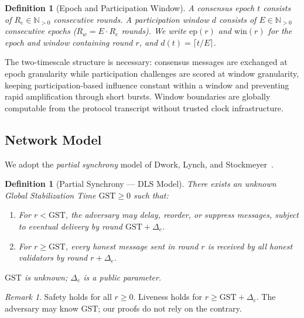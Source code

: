 \documentclass[10pt,journal,twoside]{IEEEtran}
\newtheorem{definition}[theorem]{Definition}
\theoremstyle{remark}
\newtheorem{remark}{Remark}[section]
\begin{document}
	\begin{definition}[Epoch and Participation Window]
		\label{def:timescales}
		A \emph{consensus epoch} $t$ consists of $R_e \in
		\mathbb{N}_{>0}$ consecutive rounds.
		A \emph{participation window} $d$ consists of
		$E \in \mathbb{N}_{>0}$ consecutive epochs
		($R_w = E \cdot R_e$ rounds).
		We write $\mathrm{ep}(r)$ and $\mathrm{win}(r)$ for
		the epoch and window containing round $r$, and
		$d(t) = \lceil t / E \rceil$.
	\end{definition}
	
	The two-timescale structure is necessary: consensus messages
	are exchanged at epoch granularity while participation
	challenges are scored at window granularity, keeping
	participation-based influence constant within a window and
	preventing rapid amplification through short bursts.
	Window boundaries are globally computable from the protocol
	transcript without trusted clock infrastructure.
	
	\subsection{Network Model}
	\label{ssec:network}
	
	We adopt the \emph{partial synchrony} model of
	Dwork, Lynch, and Stockmeyer~\cite{dwork1988partialsync}.
	
	\begin{definition}[Partial Synchrony --- DLS Model]
		\label{def:partialsync}
		There exists an unknown \emph{Global Stabilization Time}
		$\mathrm{GST} \geq 0$ such that:
		\begin{enumerate}
			\item[\textbf{(N1)}] For $r < \mathrm{GST}$, the
			adversary may delay, reorder, or suppress messages,
			subject to eventual delivery by round
			$\mathrm{GST} + \Delta_e$.
			\item[\textbf{(N2)}] For $r \geq \mathrm{GST}$,
			every honest message sent in round $r$ is received
			by all honest validators by round $r + \Delta_e$.
		\end{enumerate}
		$\mathrm{GST}$ is unknown; $\Delta_e$ is a public parameter.
	\end{definition}
	
	\begin{remark}
		\label{rem:gst}
		Safety holds for all $r \geq 0$.
		Liveness holds for $r \geq \mathrm{GST} + \Delta_e$.
		The adversary may know $\mathrm{GST}$; our proofs
		do not rely on the contrary.
	\end{remark}
	
\end{document}
